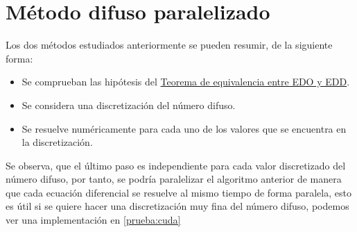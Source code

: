 \section{Método difuso paralelizado}
Los dos métodos estudiados anteriormente se pueden resumir, de la siguiente forma:
\begin{itemize}
	\item Se comprueban las hipótesis del \hyperref[teorema:equivalencia]{Teorema de equivalencia entre EDO y EDD}.
	
	\item Se considera una discretización del número difuso.
	
	\item Se resuelve numéricamente para cada uno de los valores que se encuentra en la discretización.
\end{itemize}
Se observa, que el último paso es independiente para cada valor discretizado del número difuso, por tanto, se podría paralelizar el algoritmo anterior de manera que cada ecuación diferencial se resuelve al mismo tiempo de forma paralela, esto es útil si se quiere hacer una discretización muy fina del número difuso, podemos ver una implementación en \ref{prueba:cuda}